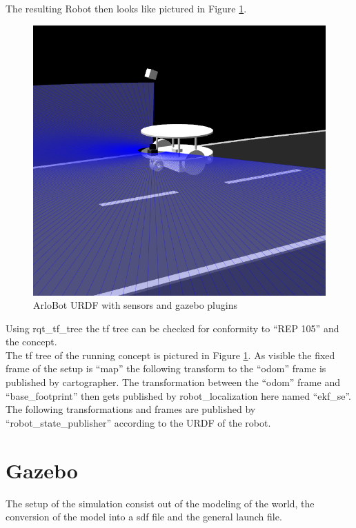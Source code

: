 The resulting Robot then looks like pictured in Figure \ref{arlourdf}.

\begin{figure}
	\includegraphics[width=\textwidth]{Pictures/arlourdf}
	\caption{ArloBot URDF with sensors and gazebo plugins}
	\label{arlourdf}
\end{figure}


Using rqt\_tf\_tree the tf tree can be checked for conformity to ``REP 105'' and the concept.\\ 
The tf tree of the running concept is pictured in Figure \ref{}. As visible the fixed frame of the setup is ``map'' the following transform to the ``odom'' frame is published by cartographer. The transformation between the ``odom'' frame and ``base\_footprint'' then gets published by robot\_localization here named ``ekf\_se''.\\
The following transformations and frames are published by ``robot\_state\_publisher'' according to the URDF of the robot.

\section{Gazebo}
The setup of the simulation consist out of the modeling of the world, the conversion of the model into a sdf file and the general launch file.


